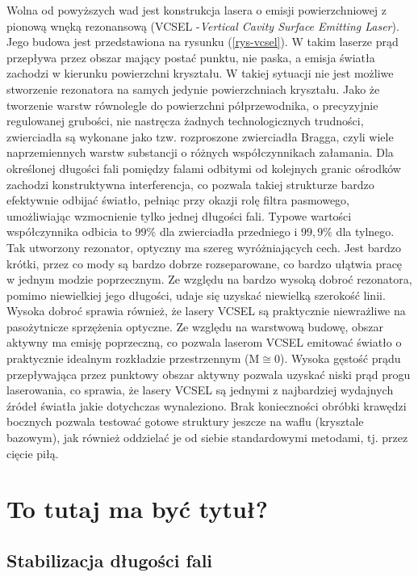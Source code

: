 \documentclass[a4paper,10pt]{article}
\begin{document}
Wolna od powyższych wad jest konstrukcja lasera o emisji powierzchniowej z pionową wnęką rezonansową (VCSEL -\textit{Vertical Cavity Surface Emitting Laser}). Jego budowa jest przedstawiona na rysunku (\ref{rys-vcsel}). W takim laserze prąd przepływa przez obszar mający postać punktu, nie paska, a emisja światła zachodzi w kierunku powierzchni kryształu. W takiej sytuacji nie jest możliwe stworzenie rezonatora na samych jedynie powierzchniach kryształu. Jako że tworzenie warstw równolegle do powierzchni półprzewodnika, o precyzyjnie regulowanej grubości, nie nastręcza żadnych technologicznych trudności, zwierciadła są wykonane jako tzw. rozproszone zwierciadła Bragga, czyli wiele naprzemiennych warstw substancji o różnych współczynnikach załamania. Dla określonej długości fali pomiędzy falami odbitymi od kolejnych granic ośrodków zachodzi konstruktywna interferencja, co pozwala takiej strukturze bardzo efektywnie odbijać światło, pełniąc przy okazji rolę filtra pasmowego, umożliwiając wzmocnienie tylko jednej długości fali. Typowe wartości współczynnika odbicia to $99\%$ dla zwierciadła przedniego i $99{,}9\%$ dla tylnego. Tak utworzony rezonator, optyczny ma szereg wyróżniających cech. Jest bardzo krótki, przez co mody są bardzo dobrze rozseparowane, co bardzo ułątwia pracę w jednym modzie poprzecznym. Ze względu na bardzo wysoką dobroć rezonatora, pomimo niewielkiej jego długości, udaje się uzyskać niewielką szerokość linii. Wysoka dobroć sprawia również, że lasery VCSEL są praktycznie niewrażliwe na pasożytnicze sprzężenia optyczne.
Ze względu na warstwową budowę, obszar aktywny ma emisję poprzeczną, co pozwala laserom VCSEL emitować światło o praktycznie idealnym rozkładzie przestrzennym (M$\cong 0$). Wysoka gęstość prądu przepływająca przez punktowy obszar aktywny pozwala uzyskać niski prąd progu laserowania, co sprawia, że lasery VCSEL są jednymi z najbardziej wydajnych źródeł światła jakie dotychczas wynaleziono. Brak konieczności obróbki krawędzi bocznych pozwala testować gotowe struktury jeszcze na waflu (krysztale bazowym), jak również oddzielać je od siebie standardowymi metodami, tj. przez cięcie piłą. 

\section{To tutaj ma być tytuł?}

\subsection{Stabilizacja długości fali}
\end{document}
